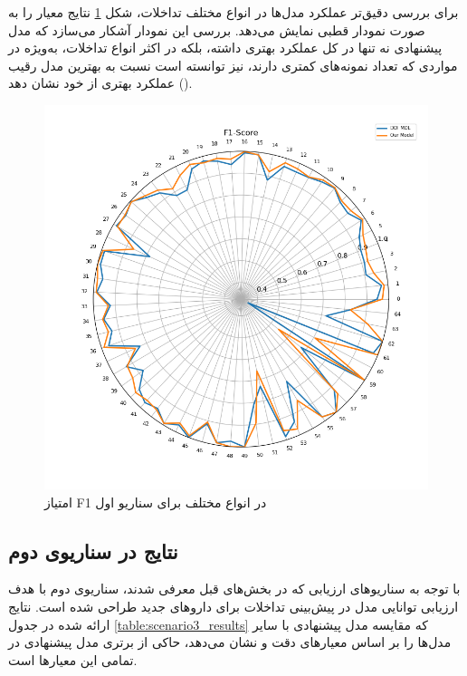برای بررسی دقیق‌تر عملکرد مدل‌ها در انواع مختلف تداخلات، شکل \ref{fig:s2_f1_score} نتایج معیار  را به صورت نمودار قطبی نمایش می‌دهد. بررسی این نمودار آشکار می‌سازد که مدل پیشنهادی نه تنها در کل عملکرد بهتری داشته، بلکه در اکثر انواع تداخلات، به‌ویژه در مواردی که تعداد نمونه‌های کمتری دارند، نیز توانسته است نسبت به بهترین مدل رقیب () عملکرد بهتری از خود نشان دهد.

\begin{figure}[t]
	\centering
	\includegraphics[width=\textwidth]{images/s2-f1-score.png}
	\caption{ امتیاز F1 در انواع مختلف برای سناریو اول }
	\label{fig:s2_f1_score}
\end{figure}

\subsection{نتایج در سناریوی دوم}

با توجه به سناریوهای ارزیابی که در بخش‌های قبل‌ معرفی شدند، سناریوی دوم با هدف ارزیابی توانایی مدل در پیش‌بینی تداخلات برای داروهای جدید طراحی شده است. نتایج ارائه شده در جدول \ref{table:scenario3_results} که مقایسه مدل پیشنهادی با سایر مدل‌ها را بر اساس معیارهای دقت و  نشان می‌دهد، حاکی از برتری مدل پیشنهادی در تمامی این معیارها است.

